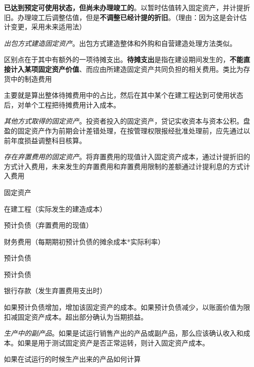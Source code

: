 \documentclass[UTF8,12pt]{ctexart}
\newenvironment{Dr}{%
	\begin{list}{}%
		{
			\setlength{\leftmargin}{2em}
			\setlength{\labelwidth}{2em}
			\setlength{\labelsep}{0pt}
			\setlength{\itemindent}{0pt}
			\setlength{\listparindent}{0pt}
			\setlength{\parsep}{0pt}
			\setlength{\topsep}{0pt}
		}
		\item[\textbf{借：}]
	}{%
	\end{list}
}
\newenvironment{Cr}{%
	\begin{list}{}%
		{
			\setlength{\leftmargin}{3em}
			\setlength{\labelwidth}{2em}
			\setlength{\labelsep}{0pt}
			\setlength{\itemindent}{0pt}
			\setlength{\listparindent}{0pt}
			\setlength{\parsep}{0pt}
			\setlength{\topsep}{0pt}
		}
		\item[\textbf{贷：}]
	}{%
	\end{list}
}
\numberwithin{equation}{section} %
\numberwithin{figure}{section}
\numberwithin{table}{section}
\begin{document}
\begin{enumerate}
		
		\textbf{已达到预定可使用状态，但尚未办理竣工的}。以暂时估值转入固定资产，并计提折旧。办理竣工后调整估值，但是\textbf{不调整已经计提的折旧}。（理由：因为这是会计估计变更，采用未来适用法）
		
		\item \textit{出包方式建造固定资产}。出包方式建造整体和外购和自营建造处理方法类似。
		
		区别点在于其中有额外的一项待摊支出。\textbf{待摊支出}是指在建设期间发生的，\textbf{不能直接计入某项固定资产价值}、而应由所建造固定资产共同负担的相关费用。类比为存货中的制造费用
		
		主要就是算出整体待摊费用中的占比，然后在其中某个在建工程达到可使用状态后，对单个工程把待摊费用计入成本。
		
		
		\item \textit{其他方式取得的固定资产}。投资者投入的固定资产，贷记实收资本与资本公积。盘盈的固定资产作为前期会计差错处理，在按管理权限报经批准处理前，应先通过以前年度损益调整科目核算。
		
		\item \textit{存在弃置费用的固定资产}。将弃置费用的现值计入固定资产成本，通过计提折旧的方式计入费用，未来发生的弃置费用和弃置费用限制的差额通过计提利息的方式计入费用
		
		\begin{Dr}
			固定资产
		\end{Dr}
		\begin{Cr}
			在建工程（实际发生的建造成本）
			
			预计负债（弃置费用的现值）
		\end{Cr}
		
		\begin{Dr}
			财务费用（每期期初预计负债的摊余成本*实际利率）
		\end{Dr}
		\begin{Cr}
			预计负债
		\end{Cr}
		
		\begin{Dr}
			预计负债
		\end{Dr}
		\begin{Cr}
			银行存款（发生弃置费用支出时）
		\end{Cr}
		
		如果预计负债增加，增加该固定资产的成本。如果预计负债减少，以账面价值为限扣减固定资产成本。超出部分确认为当期损益。
		
		\item \textit{生产中的副产品}。如果是试运行销售产出的产品或副产品，那么应该确认收入和成本。如果是用于测试固定资产是否正常运转，则计入固定资产成本。
		
		如果在试运行的时候生产出来的产品如何计算
		
	\end{enumerate}
	
\end{document}
